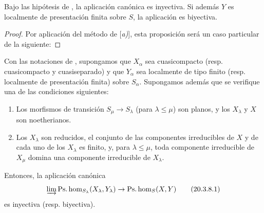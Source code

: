 \begin{proposition}[20.3.7]
\label{IV.20.3.7}
Bajo las hipótesis de , la aplicación canónica  es inyectiva.
Si además $Y$ es localmente de presentación finita sobre $S$, la aplicación  es biyectiva.
\end{proposition}

\begin{proof}
Por aplicación del método de [\emph{a)}], esta proposición será un caso particular de la siguiente:
\end{proof}

\begin{proposition}[20.3.8]
\label{IV.20.3.8}
Con las notaciones de , supongamos que $X_\alpha$ sea cuasicompacto \textup{(resp.} cuasicompacto y cuasiseparado) y que $Y_\alpha$ sea localmente de tipo finito \textup{(resp.} localmente de presentación finita) sobre $S_\alpha$.
Supongamos además que se verifique una de las condiciones siguientes:
\begin{enumerate}[label=\emph{(\roman*)}]
  \item Los morfismos de transición $S_\mu\to S_\lambda$ (para $\lambda\leq\mu$) son planos, y los $X_\lambda$ y $X$ son noetherianos.
  \item Los $X_\lambda$ son reducidos, el conjunto de las componentes irreducibles de $X$ y de cada uno de los $X_\lambda$ es finito, y, para $\lambda\leq\mu$, toda componente irreducible de $X_\mu$ domina una componente irreducible de $X_\lambda$.
\end{enumerate}
Entonces, la aplicación canónica
\[
\label{IV.20.3.8.1}
  \varinjlim\operatorname{Ps.hom}_{S_\lambda}(X_\lambda,Y_\lambda)\to\operatorname{Ps.hom}_S(X,Y)
  \tag{20.3.8.1}
\]
es inyectiva \textup{(resp.} biyectiva).
\end{proposition}

